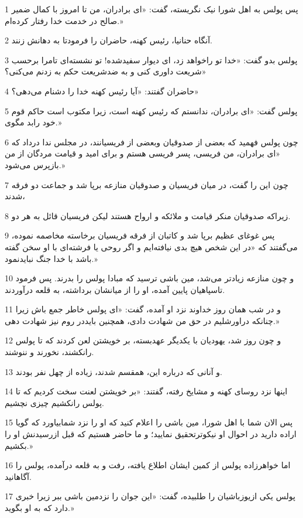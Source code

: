 \par 1 پس پولس به اهل شورا نیک نگریسته، گفت: «ای برادران، من تا امروز با کمال ضمیر صالح در خدمت خدا رفتار کرده‌ام.»
\par 2 آنگاه حنانیا، رئیس کهنه، حاضران را فرمودتا به دهانش زنند.
\par 3 پولس بدو گفت: «خدا تو راخواهد زد، ای دیوار سفیدشده! تو نشسته‌ای تامرا برحسب شریعت داوری کنی و به ضدشریعت حکم به زدنم می‌کنی؟»
\par 4 حاضران گفتند: «آیا رئیس کهنه خدا را دشنام می‌دهی؟»
\par 5 پولس گفت: «ای برادران، ندانستم که رئیس کهنه است، زیرا مکتوب است حاکم قوم خود رابد مگوی.»
\par 6 چون پولس فهمید که بعضی از صدوقیان وبعضی از فریسیانند، در مجلس ندا در‌داد که «ای برادران، من فریسی، پسر فریسی هستم و برای امید و قیامت مردگان از من بازپرس می‌شود.»
\par 7 چون این را گفت، در میان فریسیان و صدوقیان منازعه برپا شد و جماعت دو فرقه شدند،
\par 8 زیراکه صدوقیان منکر قیامت و ملائکه و ارواح هستند لیکن فریسیان قائل به هر دو.
\par 9 پس غوغای عظیم برپا شد و کاتبان از فرقه فریسیان برخاسته مخاصمه نموده، می‌گفتند که «در این شخص هیچ بدی نیافته‌ایم و اگر روحی یا فرشته‌ای با او سخن گفته باشد با خدا جنگ نبایدنمود.»
\par 10 و چون منازعه زیادتر می‌شد، مین باشی ترسید که مبادا پولس را بدرند. پس فرمود تاسپاهیان پایین آمده، او را از میانشان برداشته، به قلعه درآوردند.
\par 11 و در شب همان روز خداوند نزد او آمده، گفت: «ای پولس خاطر جمع باش زیرا چنانکه دراورشلیم در حق من شهادت دادی، همچنین بایددر روم نیز شهادت دهی.»
\par 12 و چون روز شد، یهودیان با یکدیگر عهدبسته، بر خویشتن لعن کردند که تا پولس رانکشند، نخورند و ننوشند.
\par 13 و آنانی که درباره این، همقسم شدند، زیاده از چهل نفر بودند.
\par 14 اینها نزد روسای کهنه و مشایخ رفته، گفتند: «بر خویشتن لعنت سخت کردیم که تا پولس رانکشیم چیزی نچشیم.
\par 15 پس الان شما با اهل شورا، مین باشی را اعلام کنید که او را نزد شمابیاورد که گویا اراده دارید در احوال او نیکوترتحقیق نمایید؛ و ما حاضر هستیم که قبل ازرسیدنش او را بکشیم.»
\par 16 اما خواهرزاده پولس از کمین ایشان اطلاع یافته، رفت و به قلعه درآمده، پولس را آگاهانید.
\par 17 پولس یکی ازیوزباشیان را طلبیده، گفت: «این جوان را نزدمین باشی ببر زیرا خبری دارد که به او بگوید.»

